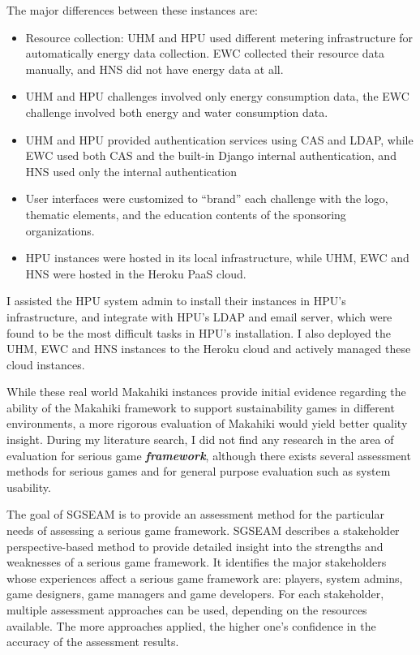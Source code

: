 The major differences between these instances are:
\begin{itemize}
\item Resource collection: UHM and HPU used different metering infrastructure for automatically energy data collection. EWC collected their resource data manually, and HNS did not have energy data at all. 
\item UHM and HPU challenges involved only energy consumption data, the EWC challenge involved both energy and water consumption data. 
\item UHM and HPU provided authentication services using CAS and LDAP, while EWC used both CAS and the built-in Django internal  authentication, and HNS used only the internal authentication
\item User interfaces were customized to ``brand'' each challenge with the logo, thematic elements, and the education contents of the sponsoring organizations.
\item HPU instances were hosted in its local infrastructure, while UHM, EWC and HNS were hosted in the Heroku PaaS cloud.
\end{itemize}

I assisted the HPU system admin to install their instances in HPU's infrastructure, and integrate with HPU's LDAP and email server, which were found to be the most difficult tasks in HPU's installation. I also deployed the UHM, EWC and HNS instances to the Heroku cloud and actively managed these cloud instances. 

While these real world Makahiki instances provide initial evidence regarding the ability of the Makahiki framework to support sustainability games in different environments, a more rigorous evaluation of Makahiki would yield better quality insight. During my literature search, I did not find any research in the area of  evaluation for serious game {\em \bf framework}, although there exists several assessment methods for serious games and for general purpose evaluation such as system usability. 

The goal of SGSEAM is to provide an assessment method for the particular needs of assessing a serious game framework. SGSEAM describes a stakeholder perspective-based method to provide detailed insight into the strengths and weaknesses of a serious game framework. It identifies the major stakeholders whose experiences affect a serious game framework are: players, system admins, game designers, game managers and game developers. For each stakeholder, multiple assessment approaches can be used, depending on the resources available. The more approaches applied, the higher one's confidence in the accuracy of the assessment results.

